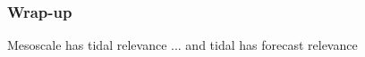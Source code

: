 \begin{frame}
\frametitle{Wrap-up}
Mesoscale has tidal relevance ... and tidal has forecast relevance
\begin{multicols}{2}
\small

\end{multicols}
\normalsize
\end{frame}